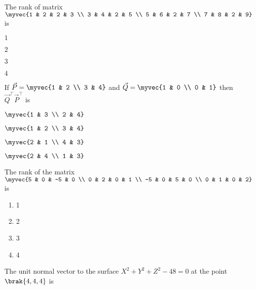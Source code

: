 \item The rank of matrix $\myvec{1 & 2 & 2 & 3 \\ 3 & 4 & 2 & 5 \\ 5 & 6 & 2 & 7 \\ 7 & 8 & 2 & 9}$ is
\hfill{}
\begin{enumerate}
\begin{multicols}{4}
    \item $1$
    \item $2$
    \item $3$
    \item $4$
\end{multicols}
\end{enumerate}
\item If $\vec{P} = \myvec{1 & 2 \\ 3 & 4}$ and $\vec{Q} = \myvec{1 & 0 \\ 0 & 1}$ then $\vec{Q}^{\top} \vec{P}^{\top}$ is
\hfill{}
\begin{enumerate}
\begin{multicols}{4}
    \item $\myvec{1 & 3 \\ 2 & 4}$
    \item $\myvec{1 & 2 \\ 3 & 4}$
    \item $\myvec{2 & 1 \\ 4 & 3}$
    \item $\myvec{2 & 4 \\ 1 & 3}$
\end{multicols}
\end{enumerate}
\item The rank of the matrix $\myvec{5 & 0 & -5 & 0 \\ 0 & 2 & 0 & 1 \\ -5 & 0 & 5 & 0 \\ 0 & 1 & 0 & 2}$ is
\hfill{}
\begin{multicols}{4}
\begin{enumerate}
    \item 1
    \item 2
    \item 3
    \item 4
\end{enumerate}
\end{multicols}
\item The unit normal vector to the surface $X^2+Y^2+Z^2-48=0$ at the point $\brak{4, 4, 4}$ is
\hfill{}
